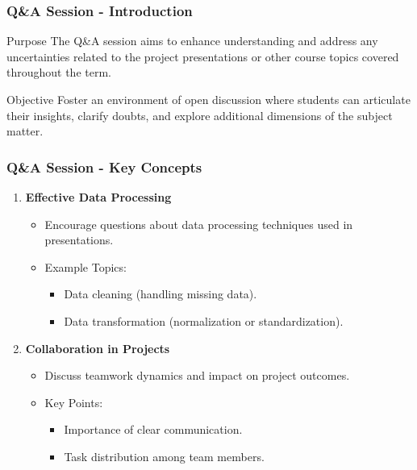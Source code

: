 \documentclass[aspectratio=169]{beamer}
\begin{document}
\begin{frame}[fragile]
    \frametitle{Q\&A Session - Introduction}
    \begin{block}{Purpose}
        The Q\&A session aims to enhance understanding and address any uncertainties related to the project presentations or other course topics covered throughout the term.
    \end{block}
    
    \begin{block}{Objective}
        Foster an environment of open discussion where students can articulate their insights, clarify doubts, and explore additional dimensions of the subject matter.
    \end{block}
\end{frame}

\begin{frame}[fragile]
    \frametitle{Q\&A Session - Key Concepts}
    \begin{enumerate}
        \item \textbf{Effective Data Processing}
            \begin{itemize}
                \item Encourage questions about data processing techniques used in presentations.
                \item Example Topics:
                    \begin{itemize}
                        \item Data cleaning (handling missing data).
                        \item Data transformation (normalization or standardization).
                    \end{itemize}
            \end{itemize}
        
        \item \textbf{Collaboration in Projects}
            \begin{itemize}
                \item Discuss teamwork dynamics and impact on project outcomes.
                \item Key Points:
                    \begin{itemize}
                        \item Importance of clear communication.
                        \item Task distribution among team members.
                    \end{itemize}
            \end{itemize}
        

\end{enumerate}
\end{frame}
\end{document}
